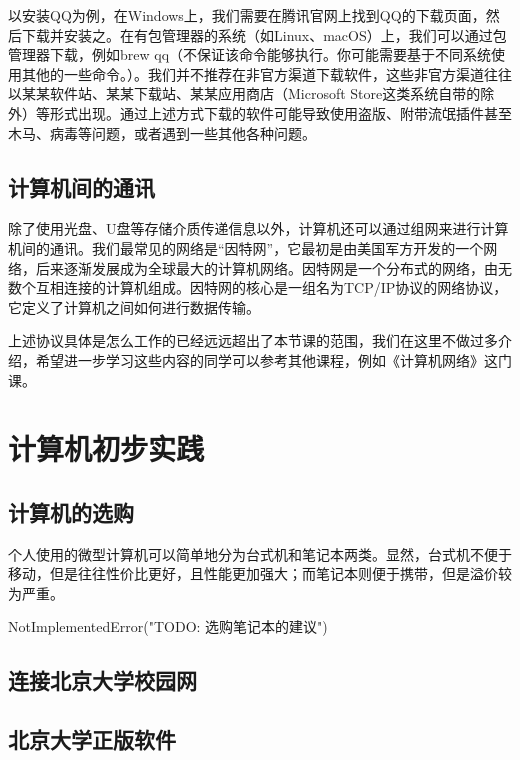 \documentclass[12pt]{report}
\begin{document}
以安装QQ为例，在Windows上，我们需要在腾讯官网上找到QQ的下载页面，然后下载并安装之。在有包管理器的系统（如Linux、macOS）上，我们可以通过包管理器下载，例如brew qq（不保证该命令能够执行。你可能需要基于不同系统使用其他的一些命令。）。我们并不推荐在非官方渠道下载软件，这些非官方渠道往往以某某软件站、某某下载站、某某应用商店（Microsoft Store这类系统自带的除外）等形式出现。通过上述方式下载的软件可能导致使用盗版、附带流氓插件甚至木马、病毒等问题，或者遇到一些其他各种问题。

\section{计算机间的通讯}

除了使用光盘、U盘等存储介质传递信息以外，计算机还可以通过组网来进行计算机间的通讯。我们最常见的网络是“因特网”，它最初是由美国军方开发的一个网络，后来逐渐发展成为全球最大的计算机网络。因特网是一个分布式的网络，由无数个互相连接的计算机组成。因特网的核心是一组名为TCP/IP协议的网络协议，它定义了计算机之间如何进行数据传输。

上述协议具体是怎么工作的已经远远超出了本节课的范围，我们在这里不做过多介绍，希望进一步学习这些内容的同学可以参考其他课程，例如《计算机网络》这门课。

\chapter{计算机初步实践}

\section{计算机的选购}

个人使用的微型计算机可以简单地分为台式机和笔记本两类。显然，台式机不便于移动，但是往往性价比更好，且性能更加强大；而笔记本则便于携带，但是溢价较为严重。

\begin{codebox}[title=选购笔记本的建议]
    NotImplementedError("TODO: 选购笔记本的建议")
\end{codebox}

\section{连接北京大学校园网}

\section{北京大学正版软件}
\end{document}
